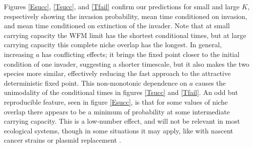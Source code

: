 Figures \ref{Esucc}, \ref{Tsucc}, and \ref{Tfail} confirm our predictions for small and large $K$, respectively showing the invasion probability, mean time conditioned on invasion, and mean time conditioned on extinction of the invader. 
Note that at small carrying capacity the WFM limit has the shortest conditional times, but at large carrying capacity this complete niche overlap has the longest. 
In general, increasing $a$ has conflicting effects; it brings the fixed point closer to the initial condition of one invader, suggesting a shorter timescale, but it also makes the two species more similar, effectively reducing the fast approach to the attractive deterministic fixed point. 
This non-monotonic dependence on $a$ causes the unimodality of the conditional times in figures \ref{Tsucc} and \ref{Tfail}. 
%
An odd but reproducible feature, seen in figure \ref{Esucc}, is that for some values of niche overlap there appears to be a minimum of probability at some intermediate carrying capacity. 
This is a low-number effect, and will not be relevant in most ecological systems, though in some situations it may apply, like with nascent cancer strains \cite{Ashcroft2015} or plasmid replacement \cite{Gooding-townsend2015}. 
%
